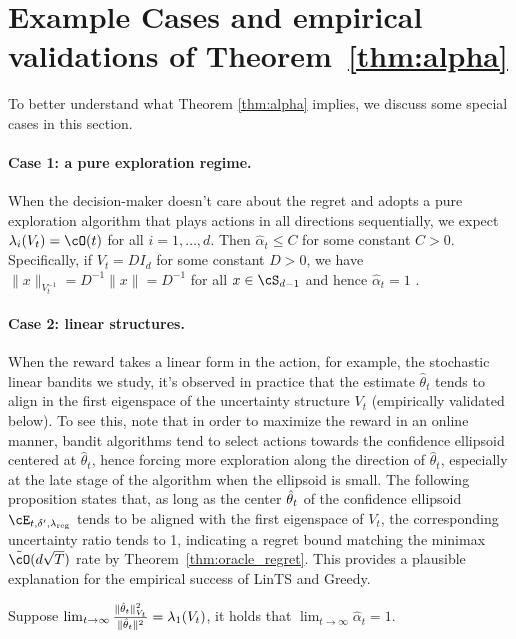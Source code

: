 \section{Example Cases and empirical validations of Theorem~\ref{thm:alpha}}
\label{sec:Cases}

To better understand what Theorem \ref{thm:alpha} implies, we discuss some special cases in this section. 

\paragraph{Case 1: a pure exploration regime.} \label{eg:pure} When the decision-maker doesn't care about the regret and adopts a pure exploration algorithm that plays actions in all directions sequentially, we expect $\lambda_i(V_t) = \cO(t)$ for all $i = 1,\dots, d$. Then $\hat{\alpha}_t \leq C$ for some constant $C>0$. Specifically, if $V_t = D I_d$ for some constant $D>0$, we have $\|x\|_{V_t^{-1}} =D^{-1} \|x\| = D^{-1}$ for all $x \in \cS_{d-1}$ and hence $ \hat{\alpha}_t = 1$  .

\paragraph{Case 2:  linear structures.} 
\label{eg:principle_eigen}

When the reward takes a linear form in the action, for example, the stochastic linear bandits we study,  it's observed in practice that the estimate $\hat{\theta}_t$ tends to align in the first eigenspace of the uncertainty structure $V_t$ (empirically validated below). To see this, note that in order to maximize the reward in an online manner, bandit algorithms tend to select actions towards the confidence ellipsoid centered at  $\hat{\theta}_t$, hence forcing more exploration along the direction of $\hat{\theta}_t$, especially at the late stage of the algorithm when the ellipsoid is small. The following proposition states that, as long as the center $\hat{\theta}_t$ of the confidence ellipsoid $\cE_{t,\delta^\prime, \lambdareg}$  tends to be aligned with the first eigenspace of $V_t$, the corresponding uncertainty ratio tends to 1, indicating a regret bound matching the minimax $\tilde{\cO}(d\sqrt{T})$ rate by Theorem~\ref{thm:oracle_regret}. This provides a plausible explanation for the empirical success of LinTS and Greedy.
\begin{proposition}\label{prop:align}
	 Suppose $\lim_{t\to \infty}\frac{\|\hat{\theta}_t\|_{V_{t}}^2}{\|\hat{\theta}_t\|^2} =\lambda_{1}(V_{t}) $, it holds that $\lim_{t\to \infty} \hat{\alpha}_t = 1$.	
\end{proposition}



